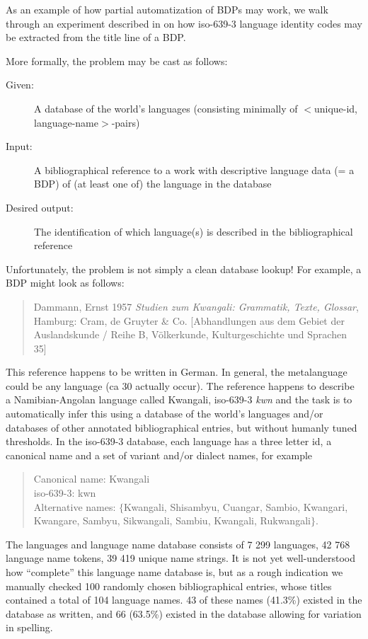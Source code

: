 \documentclass[english,11pt,twoside]{article}
\begin{document}
As an example of how partial automatization of BDPs may work, we walk
through an experiment described in \citet{cl:Hammarstrom:MMIES2} on
how iso-639-3 language identity codes may be extracted from the title
line of a BDP.

More formally, the problem may be cast as follows:
\begin{description}
\item[Given:] A database of the world's languages (consisting minimally of $<$unique-id, language-name$>$-pairs)
\item[Input:] A bibliographical reference to a work with descriptive language data (= a BDP) of (at least one of) the language in the database
\item[Desired output:] The identification of which language(s) is described in the bibliographical reference
\end{description}
Unfortunately, the problem is not simply a clean database lookup! For 
example, a BDP might look as follows:
\begin{quote}
Dammann, Ernst 1957 \emph{Studien zum Kwangali: Grammatik, Texte, Glossar}, 
Hamburg: Cram, de Gruyter \& Co. [Abhandlungen aus dem Gebiet der Auslandskunde / Reihe B, V\"olkerkunde, Kulturgeschichte und Sprachen 35]
\end{quote}
This reference happens to be written in German. In general, the
metalanguage could be any language (ca 30 actually occur). The
reference happens to describe a Namibian-Angolan language called
Kwangali, iso-639-3 \emph{kwn} and the task is to automatically infer
this using a database of the world's languages and/or databases of
other annotated bibliographical entries, but without humanly tuned
thresholds. In the iso-639-3 database, each language has a three
letter id, a canonical name and a set of variant and/or dialect names,
for example
\begin{quote}
  Canonical name: Kwangali\\
  iso-639-3: kwn\\
  Alternative names: $\{$Kwangali, Shisambyu, Cuangar, Sambio, Kwangari, Kwangare, Sambyu, Sikwangali, Sambiu, Kwangali, Rukwangali$\}$.
\end{quote}

The languages and language name database consists of 7 299 languages,
42 768 language name tokens, 39 419 unique name strings. It is not yet
well-understood how ``complete'' this language name database is, but
as a rough indication we manually checked 100 randomly chosen
bibliographical entries, whose titles contained a total of 104
language names.  43 of these names (41.3\%) existed in the database as
written, and 66 (63.5\%) existed in the database allowing for
variation in spelling.
\end{document}
